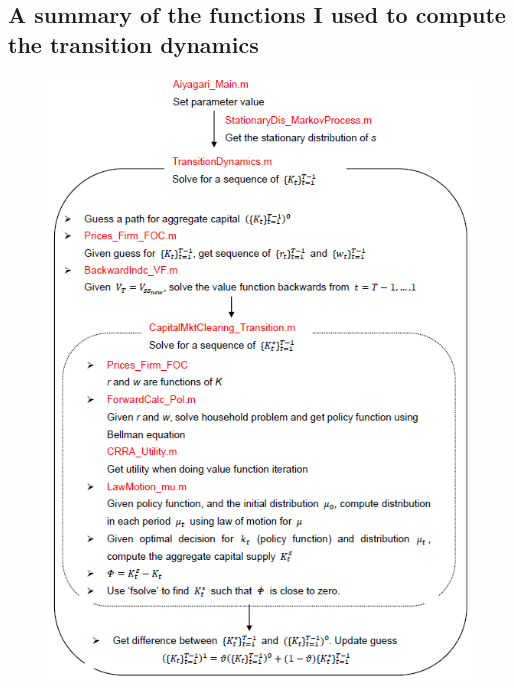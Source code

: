 \documentclass{article}
\begin{document}
\begin{spacing}{1.5}
\subsection*{A summary of the functions I used to compute the transition dynamics}
\begin{figure}[!htb]
\centering
\hspace*{2cm}\includegraphics[width=\textwidth,natwidth=400,natheight=400]{readme2.png}\hspace*{-2cm}\\
\end{figure}


\newpage

\end{spacing}
\end{document}
